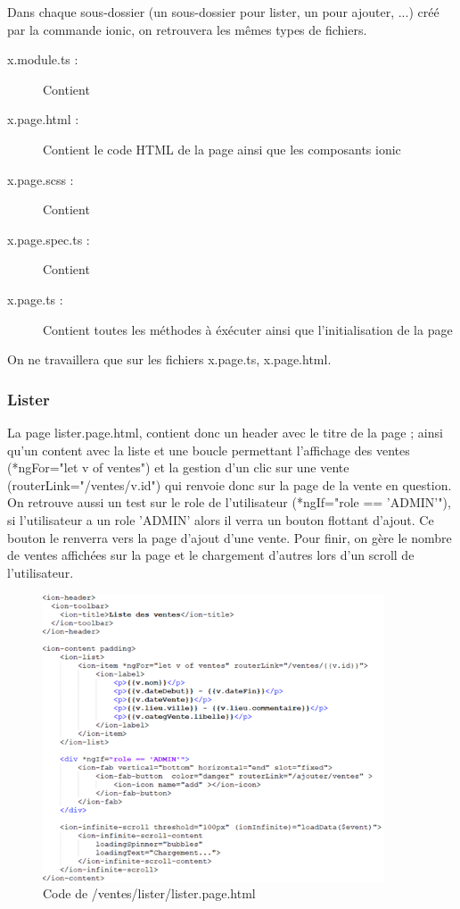 			Dans chaque sous-dossier (un sous-dossier pour lister, un pour ajouter, ...) créé par la commande ionic, on retrouvera les mêmes types de fichiers.\newline

			\begin{description}
				\item[x.module.ts :]{Contient }%
				\item[x.page.html :]{Contient le code HTML de la page ainsi que les composants ionic}
				\item[x.page.scss :]{Contient}%
				\item[x.page.spec.ts :]{Contient}%
				\item[x.page.ts :]{Contient toutes les méthodes à éxécuter ainsi que l'initialisation de la page}
			\end{description}

			On ne travaillera que sur les fichiers x.page.ts, x.page.html.

			\subsubsection{Lister}

					La page lister.page.html, contient donc un header avec le titre de la page ; ainsi qu'un content avec la liste et une boucle permettant l'affichage des ventes (*ngFor="let v of ventes") et la gestion d'un clic sur une vente (routerLink="/ventes/{{v.id}}") qui renvoie donc sur la page de la vente en question. \newline
					On retrouve aussi un test sur le role de l'utilisateur (*ngIf="role == 'ADMIN'"), si l'utilisateur a un role 'ADMIN' alors il verra un bouton flottant d'ajout. Ce bouton le renverra vers la page d'ajout d'une vente. \newline
					Pour finir, on gère le nombre de ventes affichées sur la page et le chargement d'autres lors d'un scroll de l'utilisateur.

					\begin{figure}[H]
						\centering\includegraphics[width=0.9\textwidth, keepaspectratio]{res/lister.png}
						\caption{Code de /ventes/lister/lister.page.html}
					\end{figure}

